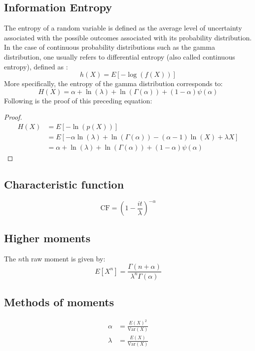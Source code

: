 \documentclass[12pt]{article}
\begin{document}
\subsection{Information Entropy}
The entropy of a random variable is defined as the average level of uncertainty associated with the possible outcomes
associated with its probability distribution. In the case of continuous probability distributions such as the gamma
distribution, one usually refers to differential entropy (also called continuous entropy), defined
as\cite{wikipediaDifferentialEntropy2022, wikipediaGammaDistribution2022} :
\begin{equation}
	h(X) = E[-\log(f(X))]
\end{equation}
More specifically, the entropy of the gamma distribution corresponds to:
\begin{equation}
	H(X) = \alpha + \ln(\lambda) + \ln(\Gamma(\alpha)) + (1-\alpha)\psi(\alpha)
\end{equation}
Following is the proof of this preceding equation:
\begin{proof}
	\begin{equation}
		\begin{split}
			H(X)	&=	E[-\ln(p(X))]\\
					&=	E[-\alpha\ln(\lambda) + \ln(\Gamma(\alpha)) - (\alpha-1)\ln(X) + \lambda X]\\
					&=	\alpha + \ln(\lambda) + \ln(\Gamma(\alpha)) + (1-\alpha)\psi(\alpha)
		\end{split}
	\end{equation}
\end{proof}

\subsection{Characteristic function \incomplete}\label{subec:advancedproperties:cf}
\begin{equation}
	\text{CF} = \left(1-\frac{it}{\lambda}\right)^{-\alpha}
\end{equation}

\subsection{Higher moments \incomplete}
The $n$th raw moment is given by:
\begin{equation}
	E[X^n] = \frac{\Gamma(n+\alpha)}{\lambda^n\Gamma(\alpha)}
\end{equation}
\subsection{Methods of moments \incomplete}
\begin{equation}
	\begin{split}
		\alpha	&=	\frac{E(X)^2}{\text{Var}(X)}\\
		\lambda	&=	\frac{E(X)}{\text{Var}(X)}
	\end{split}
\end{equation}
\end{document}
